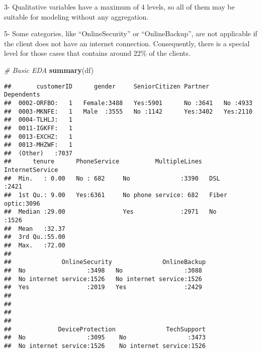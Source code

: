 \documentclass[
]{article}
\newenvironment{Shaded}{\begin{snugshade}}{\end{snugshade}}
\newcommand{\CommentTok}[1]{\textcolor[rgb]{0.56,0.35,0.01}{\textit{#1}}}
\newcommand{\FunctionTok}[1]{\textcolor[rgb]{0.13,0.29,0.53}{\textbf{#1}}}
\newcommand{\NormalTok}[1]{#1}
\begin{document}
3- Qualitative variables have a maximum of 4 levels, so all of them may
be suitable for modeling without any aggregation.

5- Some categories, like ``OnlineSecurity'' or ``OnlineBackup'', are not
applicable if the client does not have an internet connection.
Consequently, there is a special level for those cases that contains
around 22\% of the clients.

\begin{Shaded}
\begin{Highlighting}[]
\CommentTok{\# Basic EDA}
\FunctionTok{summary}\NormalTok{(df)}
\end{Highlighting}
\end{Shaded}

\begin{verbatim}
##       customerID      gender     SeniorCitizen Partner    Dependents
##  0002-ORFBO:   1   Female:3488   Yes:5901      No :3641   No :4933  
##  0003-MKNFE:   1   Male  :3555   No :1142      Yes:3402   Yes:2110  
##  0004-TLHLJ:   1                                                    
##  0011-IGKFF:   1                                                    
##  0013-EXCHZ:   1                                                    
##  0013-MHZWF:   1                                                    
##  (Other)   :7037                                                    
##      tenure      PhoneService          MultipleLines     InternetService
##  Min.   : 0.00   No : 682     No              :3390   DSL        :2421  
##  1st Qu.: 9.00   Yes:6361     No phone service: 682   Fiber optic:3096  
##  Median :29.00                Yes             :2971   No         :1526  
##  Mean   :32.37                                                          
##  3rd Qu.:55.00                                                          
##  Max.   :72.00                                                          
##                                                                         
##              OnlineSecurity              OnlineBackup 
##  No                 :3498   No                 :3088  
##  No internet service:1526   No internet service:1526  
##  Yes                :2019   Yes                :2429  
##                                                       
##                                                       
##                                                       
##                                                       
##             DeviceProtection              TechSupport  
##  No                 :3095    No                 :3473  
##  No internet service:1526    No internet service:1526  

\end{verbatim}
\end{document}
